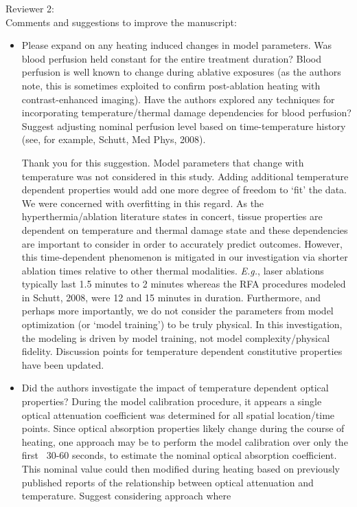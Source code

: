 \documentclass[letterpaper,12pt]{report}
\begin{document}
Reviewer 2:\\
Comments and suggestions to improve the manuscript:\\
\begin{itemize}
\item
Please expand on any heating induced changes in model parameters. Was blood perfusion held constant for the
entire treatment duration? Blood perfusion is well
known to change during ablative exposures (as the
authors note, this is sometimes exploited to confirm post-ablation heating with contrast-enhanced imaging).  Have the authors explored any techniques for
incorporating temperature/thermal damage dependencies for blood perfusion? Suggest adjusting nominal
perfusion level based on time-temperature history (see, for example, Schutt, Med Phys, 2008).

{\color{red}
Thank you for this suggestion. Model parameters that change with temperature was
not considered in this study. 
Adding additional temperature dependent
properties would add one more degree of freedom to `fit' the data. 
We were concerned with overfitting in this regard.
As the hyperthermia/ablation literature states in concert, tissue properties
are dependent on temperature and thermal damage state and these dependencies
are important to consider in order to accurately predict
outcomes. 
However, this time-dependent phenomenon is mitigated in our investigation via shorter ablation
times relative to other thermal modalities. \textit{E.g.}, laser ablations typically last 1.5 minutes to 2 minutes
whereas the RFA procedures modeled in Schutt, 2008, were 12 and 15 minutes in duration. Furthermore, and
perhaps more importantly, we do not consider the parameters from model optimization
(or `model training') to be truly physical. In this investigation,
the modeling is driven by model training, not model complexity/physical fidelity. 
Discussion points for temperature dependent constitutive properties have
been updated.
}
\item
Did the authors investigate the impact of temperature dependent optical properties? During the model
calibration procedure, it appears a single optical attenuation coefficient was determined for all spatial
location/time points. Since optical absorption properties likely change during the course of heating,
one approach may be to perform the model calibration over only the first ~30-60 seconds, to estimate the
nominal optical absorption coefficient. This nominal value could then modified during heating based on
previously published reports of the relationship between optical attenuation and temperature. Suggest
considering approach where


\end{itemize}
\end{document}
